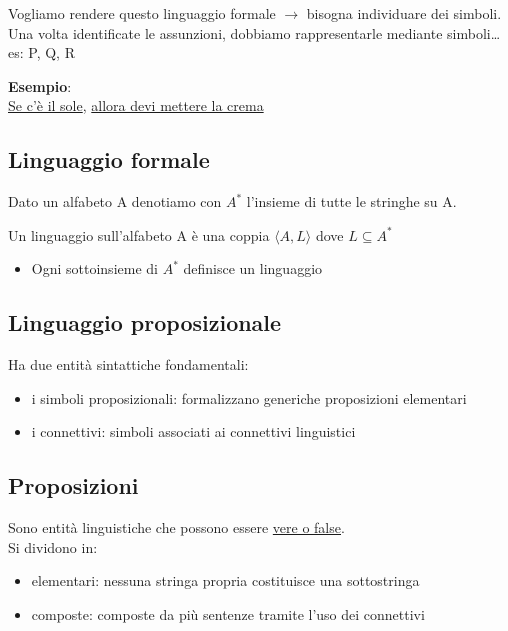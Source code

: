 \documentclass[a4paper, 12pt]{book}
\newcommand{\definizione}[2]{%
\vspace{15pt}%
\begin{tcolorbox}[
  colback=cyan!5!white,
  colframe=blue!50!black,
  title=\textbf{Definizione: #1}, %
  coltitle=white,
  fonttitle=\bfseries,
  arc=3mm,
  boxrule=0.5pt,
  enhanced,
  breakable
]
#2 %
\end{tcolorbox}
\vspace{15pt}%
}
\begin{document}
  Vogliamo rendere questo linguaggio formale $\rightarrow$ bisogna individuare dei simboli.\\
  Una volta identificate le assunzioni, dobbiamo rappresentarle mediante simboli\dots \\es: P, Q, R

  \textbf{Esempio}:\\
  \uline{Se c'è il sole}, \uline{allora devi mettere la crema}

  
  \subsection*{Linguaggio formale}
  Dato un alfabeto A denotiamo con $A^*$ l'insieme di tutte le stringhe su A.

  \definizione{Linguaggio}{Un linguaggio sull'alfabeto A è una coppia $\langle A,L \rangle$ dove $L \subseteq A^*$
  \begin{itemize}
    \item Ogni sottoinsieme di $A^*$ definisce un linguaggio
  \end{itemize}
  }

  \subsection*{Linguaggio proposizionale}
  Ha due entità sintattiche fondamentali:
  \begin{itemize}
    \item i simboli proposizionali: formalizzano generiche proposizioni elementari
    \item i connettivi: simboli associati ai connettivi linguistici
  \end{itemize}

\subsection*{Proposizioni}
Sono entità linguistiche che possono essere \uline{vere o false}.\\
  Si dividono in:
  \begin{itemize}
    \item elementari: nessuna stringa propria costituisce una sottostringa
    \item composte: composte da più sentenze tramite l'uso dei connettivi
  \end{itemize}
\end{document}
